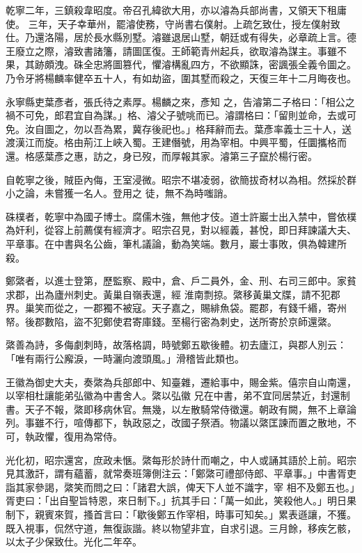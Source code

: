 \begin{pinyinscope}
 乾寧二年，三鎮殺韋昭度。帝召孔緯欲大用，亦以濬為兵部尚書，又領天下租庸使。
 三年，天子幸華州，罷濬使務，守尚書右僕射。上疏乞致仕，授左僕射致仕。乃還洛陽，居於長水縣別墅。濬雖退居山墅，朝廷或有得失，必章疏上言。德王廢立之際，濬致書諸籓，請圖匡復。王師範青州起兵，欲取濬為謀主。事雖不果，其跡頗洩。硃全忠將圖篡代，懼濬構亂四方，不欲顯誅，密諷張全義令圖之。乃令牙將楊麟率健卒五十人，有如劫盜，圍其墅而殺之，天復三年十二月晦夜也。



 永寧縣吏葉彥者，張氏待之素厚。楊麟之來，彥知
 之，告濬第二子格曰：「相公之禍不可免，郎君宜自為謀。」格、濬父子號咷而已。濬謂格曰：「留則並命，去或可免。汝自圖之，勿以吾為累，冀存後祀也。」格拜辭而去。葉彥率義士三十人，送渡漢江而旋。格由荊江上峽入蜀。王建僭號，用為宰相。中興平蜀，任圜攜格而還。格感葉彥之惠，訪之，身已歿，而厚報其家。濬第三子竄於楊行密。



 自乾寧之後，賊臣內侮，王室浸微。昭宗不堪凌弱，欲簡拔奇材以為相。然採於群小之論，未嘗獲一名人。登用之
 徒，無不為時嗤誚。



 硃樸者，乾寧中為國子博士。腐儒木強，無他才伎。道士許巖士出入禁中，嘗依樸為奸利，從容上前薦僕有經濟才。昭宗召見，對以經義，甚悅，即日拜諫議大夫、平章事。在中書與名公齒，筆札議論，動為笑端。數月，巖士事敗，俱為韓建所殺。



 鄭綮者，以進士登第，歷監察、殿中，倉、戶二員外，金、刑、右司三郎中。家貧求郡，出為廬州刺史。黃巢自嶺表還，經
 淮南剽掠。綮移黃巢文牒，請不犯郡界。巢笑而從之，一郡獨不被寇。天子嘉之，賜緋魚袋。罷郡，有錢千緡，寄州帑。後郡數陷，盜不犯鄭使君寄庫錢。至楊行密為刺史，送所寄於京師還綮。



 綮善為詩，多侮劇刺時，故落格調，時號鄭五歇後體。初去廬江，與郡人別云：「唯有兩行公廨淚，一時灑向渡頭風。」滑稽皆此類也。



 王徽為御史大夫，奏綮為兵部郎中、知臺雜，遷給事中，賜金紫。僖宗自山南還，以宰相杜讓能弟弘徽為中書舍人。綮以弘徽
 兄在中書，弟不宜同居禁近，封還制書。天子不報，綮即移病休官。無幾，以左散騎常侍徵還。朝政有闕，無不上章論列。事雖不行，喧傳都下，執政惡之，改國子祭酒。物議以綮匡諫而置之散地，不可，執政懼，復用為常侍。



 光化初，昭宗還宮，庶政未愜。綮每形於詩什而嘲之，中人或誦其語於上前。昭宗見其激訐，謂有蘊蓄，就常奏班簿側注云：「鄭綮可禮部侍郎、平章事。」中書胥吏詣其家參謁，綮笑而問之曰：「諸君大誤，俾天下人並不識字，宰
 相不及鄭五也。」胥吏曰：「出自聖旨特恩，來日制下。」抗其手曰：「萬一如此，笑殺他人。」明日果制下，親賓來賀，搔首言曰：「歇後鄭五作宰相，時事可知矣。」累表遜讓，不獲。既入視事，侃然守道，無復詼諧。終以物望非宜，自求引退。三月餘，移疾乞骸，以太子少保致仕。光化二年卒。




\end{pinyinscope}
